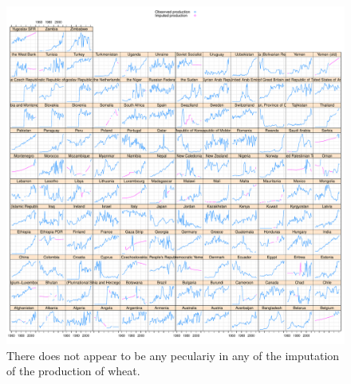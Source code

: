 \documentclass[nojss]{jss}\usepackage[]{graphicx}\usepackage[]{color}
\makeatletter
\def\maxwidth{ %
  \ifdim\Gin@nat@width>\linewidth
    \linewidth
  \else
    \Gin@nat@width
  \fi
}
\newenvironment{knitrout}{}{} %
\makeatother
\begin{document}
\begin{knitrout}
\color{fgcolor}\begin{figure}[!ht]


{\centering \includegraphics[width=\maxwidth]{figure/wheat-production-imputed} 

}

\caption[There does not appear to be any peculariy in any of the imputation of the production of wheat]{There does not appear to be any peculariy in any of the imputation of the production of wheat.\label{fig:wheat-production-imputed}}
\end{figure}


\end{knitrout}
\end{document}
